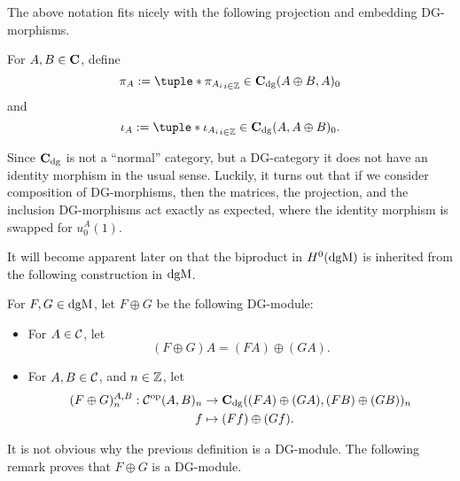 The above notation fits nicely with the following projection and embedding DG-morphisms.
\begin{definition}
    For \( A, B \in \operatorname{\mathbf{C}} \), define
    \[
        \pi_A := \tuple*{\pi_{A_i}}_{i \in \Zb} \in \C_{\dg}(A \oplus B, A)_0
    \]
    and
    \[
        \iota_A := \tuple*{\iota_{A_i}}_{i \in \Zb} \in \C_{\dg}(A, A \oplus B)_0.
    \]
\end{definition}

Since \( \operatorname{\mathbf{C}}_{\operatorname{dg}} \) is not a ``normal'' category, but a DG-category it does not have an identity morphism in the usual sense. Luckily, it turns out that if we consider composition of DG-morphisms, then the matrices, the projection, and the inclusion DG-morphisms act exactly as expected, where the identity morphism is swapped for \( u_0^A(1) \).

It will become apparent later on that the biproduct in \( H^0(\operatorname{dgM}) \) is inherited from the following construction in \( \operatorname{dgM} \).

\begin{definition}
    \label{def:dgm_biproduct}
    For \( F, G \in \operatorname{dgM} \), let \( F \oplus G \) be the following DG-module:
    \begin{itemize}
        \item {
            For \( A \in {\mathcal{C}} \), let
            \[
                (F \oplus G) A = (F A) \oplus (G A).
            \]
        }
        \item {
            For \( A, B \in {\mathcal{C}} \), and \( n \in {\mathbb{Z}} \), let
            \begin{align*}
                (F \oplus G)_n^{A, B}: {\mathcal{C}}^{\operatorname{op}}(A, B)_n &\to \operatorname{\mathbf{C}}_{\operatorname{dg}}((F A) \oplus (G A), (F B) \oplus (G B))_n \\
                f &\mapsto (F f) \oplus (G f).
            \end{align*}
        }
    \end{itemize}
\end{definition}

It is not obvious why the previous definition is a DG-module. The following remark proves that \( F \oplus G \) is a DG-module.

